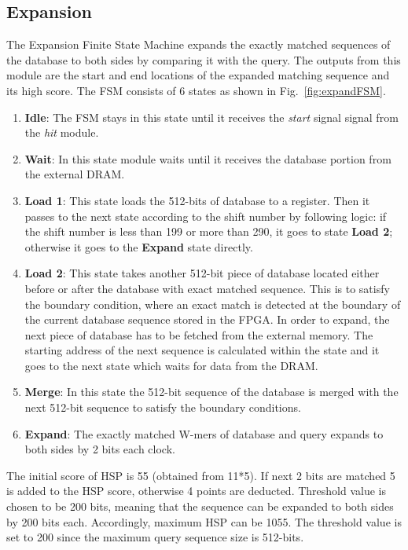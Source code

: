 \subsection{Expansion}
The Expansion Finite State Machine expands the exactly matched sequences of the database to both sides by comparing it with the query. 
The outputs from this module  are the start and end locations of the expanded matching sequence and its high score. The FSM consists of 6 states as shown in Fig.~\ref{fig:expandFSM}.

\begin{enumerate}
  \item \textbf{Idle}: The FSM stays in this state until it receives the \textit{start} signal signal from the \textit{hit} module.
  \item \textbf{Wait}: In this state module waits until it receives the database portion from the external DRAM.
  \item \textbf{Load 1}: This state loads the 512-bits of database to a register. Then it passes to the next state according to the shift number by following logic: if the shift number is less than 199 or more than 290, it goes to state \textbf{Load 2}; otherwise it goes to the \textbf{Expand} state directly. 
  \item \textbf{Load 2}: This state takes another 512-bit piece of database located either before or after the database with exact matched sequence. This is to satisfy the boundary condition, where an exact match is detected at the boundary of the current database sequence stored in the FPGA. In order to expand, the next piece of database has to be fetched from the external memory. 
The starting address of the next sequence is calculated within the state and it goes to the next state which waits for data from the DRAM. 
  \item \textbf{Merge}: In this state the 512-bit sequence of the database is merged with the next 512-bit sequence to satisfy the boundary conditions.
  \item \textbf{Expand}: The exactly matched W-mers of database and query expands to both sides by 2 bits each clock.
\end{enumerate}

The initial score of HSP is 55 (obtained from 11*5). 
If next 2 bits are matched 5 is added to the HSP score, otherwise 4 points are deducted. 
Threshold value is chosen to be 200 bits, meaning that the sequence can be expanded to both sides by 200 bits each. 
Accordingly, maximum HSP can be 1055. 
The threshold value is set to 200 since the maximum query sequence size is 512-bits.
       

